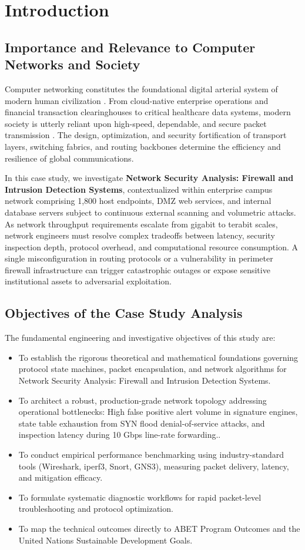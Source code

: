 \section{Introduction}

\subsection{Importance and Relevance to Computer Networks and Society}
Computer networking constitutes the foundational digital arterial system of modern human civilization \cite{kurose2021computer}. From cloud-native enterprise operations and financial transaction clearinghouses to critical healthcare data systems, modern society is utterly reliant upon high-speed, dependable, and secure packet transmission \cite{tanenbaum2021computer}. The design, optimization, and security fortification of transport layers, switching fabrics, and routing backbones determine the efficiency and resilience of global communications.

In this case study, we investigate \textbf{Network Security Analysis: Firewall and Intrusion Detection Systems}, contextualized within enterprise campus network comprising 1,800 host endpoints, DMZ web services, and internal database servers subject to continuous external scanning and volumetric attacks. As network throughput requirements escalate from gigabit to terabit scales, network engineers must resolve complex tradeoffs between latency, security inspection depth, protocol overhead, and computational resource consumption. A single misconfiguration in routing protocols or a vulnerability in perimeter firewall infrastructure can trigger catastrophic outages or expose sensitive institutional assets to adversarial exploitation.

\subsection{Objectives of the Case Study Analysis}
The fundamental engineering and investigative objectives of this study are:
\begin{itemize}
  \item To establish the rigorous theoretical and mathematical foundations governing protocol state machines, packet encapsulation, and network algorithms for Network Security Analysis: Firewall and Intrusion Detection Systems.
  \item To architect a robust, production-grade network topology addressing operational bottlenecks: High false positive alert volume in signature engines, state table exhaustion from SYN flood denial-of-service attacks, and inspection latency during 10 Gbps line-rate forwarding..
  \item To conduct empirical performance benchmarking using industry-standard tools (Wireshark, iperf3, Snort, GNS3), measuring packet delivery, latency, and mitigation efficacy.
  \item To formulate systematic diagnostic workflows for rapid packet-level troubleshooting and protocol optimization.
  \item To map the technical outcomes directly to ABET Program Outcomes and the United Nations Sustainable Development Goals.
\end{itemize}
